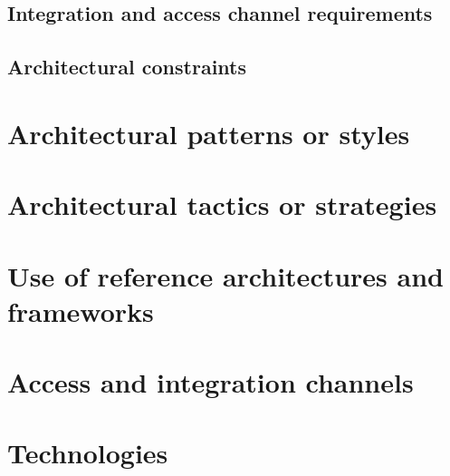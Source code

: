 \documentclass[a4paper,12pt,titlepage]{article}
\begin{document}
\subsection{Integration and access channel requirements}
\newpage
\subsection{Architectural constraints}
\newpage
\section{Architectural patterns or styles}
\newpage
\section{Architectural tactics or strategies}
\newpage
\section{Use of reference architectures and frameworks}
\newpage
\section{Access and integration channels}
\newpage
\section{Technologies}
\end{document}
